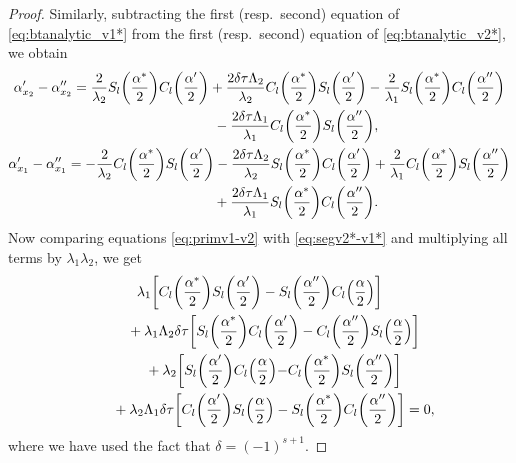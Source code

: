 \documentclass[10pt,a4paper]{amsart}
\numberwithin{equation}{section}
\begin{document}
\begin{proof}
Similarly, subtracting the first (resp.\ second) equation of \eqref{eq:btanalytic_v1*} from the first (resp.\ second) equation of \eqref{eq:btanalytic_v2*}, we obtain
\begin{gather}
\alpha'_{x_2}-\alpha''_{x_2} = \frac{2}{\lambda_2}S_{l}\biggl(\frac{\alpha^*}{2}\biggr)C_{l}\biggl(\frac{\alpha'}{2}\biggr)+ \frac{2\delta\tau\Lambda_2}{\lambda_2} C_{l}\biggl(\frac{\alpha^*}{2}\biggr)S_{l}\biggl(\frac{\alpha'}{2}\biggr)-\frac{2}{\lambda_1}S_{l}\biggl(\frac{\alpha^*}{2}\biggr)C_{l}\biggl(\frac{\alpha''}{2}\biggr)
\nonumber\\ \hphantom{\alpha'_{x_2}-\alpha''_{x_2} =}{}
-\frac{2\delta\tau\Lambda_1}{\lambda_1} C_{l}\biggl(\frac{\alpha^*}{2}\biggr)S_{l}\biggl(\frac{\alpha''}{2}\biggr),\label{eq:primv2*-v1*}
\\
\alpha'_{x_1}-\alpha''_{x_1}=
-\frac{2}{\lambda_2}C_{l}\biggl(\frac{\alpha^*}{2}\biggr)S_{l}\biggl(\frac{\alpha'}{2}\biggr)-\frac{2\delta\tau\Lambda_2}{\lambda_2} S_{l}\biggl(\frac{\alpha^*}{2}\biggr)C_{l}\biggl(\frac{\alpha'}{2}\biggr)+\frac{2}{\lambda_1}C_{l}\biggl(\frac{\alpha^*}{2}\biggr)S_{l}\biggl(\frac{\alpha''}{2}\biggr)
\nonumber\\ \hphantom{\alpha'_{x_1}-\alpha''_{x_1}=}{}
+\frac{2\delta\tau\Lambda_1}{\lambda_1} S_{l}\biggl(\frac{\alpha^*}{2}\biggr)C_{l}\biggl(\frac{\alpha''}{2}\biggr). \label{eq:segv2*-v1*}
\end{gather}
Now comparing equations \eqref{eq:primv1-v2} with \eqref{eq:segv2*-v1*} and multiplying all terms by $\lambda_1\lambda_2$, we get
\begin{gather*} %
\lambda_1
\biggl[ C_l\biggl(\frac{\alpha^*}{2}\biggr) S_l\biggl(\frac{\alpha'}{2}\biggr)
-S_l\biggl(\frac{\alpha''}{2}\biggr) C_l\Bigl(\frac{\alpha}{2}\Bigr)\biggr]\\
\qquad{}+\lambda_1\Lambda_2\delta\tau
\biggl[ S_l\biggl(\frac{\alpha^*}{2}\biggr) C_l\biggl(\frac{\alpha'}{2}\biggr)
-C_l\biggl(\frac{\alpha''}{2}\biggr) S_l\Bigl(\frac{\alpha}{2}\Bigr)\biggr] \\
\qquad{}+\lambda_2 \biggl[ S_l\biggl(\frac{\alpha'}{2}\biggr) C_l\Bigl(\frac{\alpha}{2}\Bigl)
 - C_l\biggl(\frac{\alpha^*}{2}\biggr) S_l\biggl(\frac{\alpha''}{2}\biggr) \biggr]\\
 \qquad{}+\lambda_2\Lambda_1\delta\tau \biggl[ C_l\biggl(\frac{\alpha'}{2}\biggr) S_l\Bigl(\frac{\alpha}{2}\Bigr)
 - S_l\biggl(\frac{\alpha^*}{2}\biggr) C_l\biggl(\frac{\alpha''}{2}\biggr) \biggr]=0,
\end{gather*}
where we have used the fact that $\delta=(-1)^{s+1}$.


\end{proof}
\end{document}

